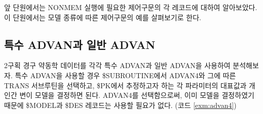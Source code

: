 \documentclass[
  10pt,
  krantz2,
  a4paper]{krantz}
\theoremstyle{definition}
\theoremstyle{definition}
\theoremstyle{definition}
\theoremstyle{remark}
\begin{document}
앞 단원에서는 NONMEM 실행에 필요한 제어구문의 각 레코드에 대하여 알아보았다. 이 단원에서는 모델 종류에 따른 제어구문의 예를 살펴보기로 한다.

\hypertarget{uxd2b9uxc218-advanuxacfc-uxc77cuxbc18-advan}{%
\subsection{특수 ADVAN과 일반 ADVAN}\label{uxd2b9uxc218-advanuxacfc-uxc77cuxbc18-advan}}

2구획 경구 약동학 데이터를 각각 특수 ADVAN과 일반 ADVAN을 사용하여 분석해보자. 특수 ADVAN을 사용할 경우 \$SUBROUTINE에서 ADVAN4와 그에 따른 TRANS 서브루틴을 선택하고, \$PK에서 추정하고자 하는 각 파라미터의 대표값과 개인간 변이 모델을 결정하면 된다. ADVAN4를 선택함으로써, 이미 모델을 결정하였기 때문에 \$MODEL과 \$DES 레코드는 사용할 필요가 없다. (코드 \ref{exm:advan4})
\end{document}
